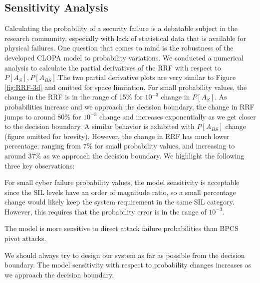 \documentclass[journal]{IEEEtran}
\begin{document}
\subsection{Sensitivity Analysis}
Calculating the probability of a security failure is a debatable subject in the research community, especially with lack of statistical data that is available for physical failures. One question that comes to mind is the robustness of the developed CLOPA model to probability variations. We conducted a numerical analysis to calculate the partial derivatives of the RRF with respect to $P[A_S], P[A_{BS}]$.The two partial derivative plots are very similar to Figure \ref{fig:RRF-3d} and omitted for space limitation. For small probability values, the change in the RRF is in the range of 15\% for $10^{-3}$ change in $P[A_S]$. As probabilities increase and we approach the decision boundary, the change in RRF jumps to around 80\% for $10^{-3}$ change and increases exponentially as we get closer to the decision boundary. A similar behavior is exhibited with $P[A_{BS}]$ change (figure omitted for brevity). However, the change in RRF has much lower percentage, ranging from 7\% for small probability values, and increasing to around 37\% as we approach the decision boundary. We highlight the following three key observations: \begin{inparaenum}[(1)]
\item For small cyber failure probability values, the model sensitivity is acceptable since the SIL levels have an order of magnitude ratio, so a small percentage change would likely keep the system requirement in the same SIL category. However, this requires that the probability error is in the range of $10^{-3}$.
\item The model is more sensitive to direct attack failure probabilities than BPCS pivot attacks.
\item We should always try to design our system as far as possible from the decision boundary. The model sensitivity with respect to probability changes increases as we approach the decision boundary.
\end{inparaenum}

\end{document}
